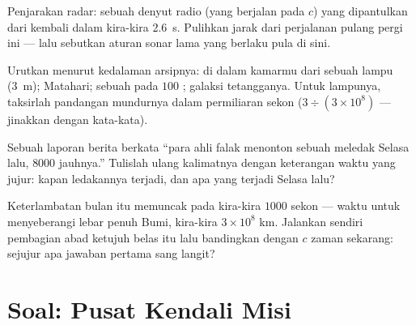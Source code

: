 \begin{exercise}[$\star\star$]\label{exo:g8:speed-of-light:9}
Penjarakan radar: sebuah denyut radio (yang berjalan pada $c$) yang
dipantulkan dari  kembali dalam kira-kira \qty{2.6}{s}. Pulihkan
jarak  dari perjalanan pulang pergi ini --- lalu sebutkan aturan
sonar lama yang berlaku pula di sini.
\end{exercise}

\begin{exercise}[$\star\star$]\label{exo:g8:speed-of-light:10}
Urutkan menurut kedalaman arsipnya:  di dalam kamarmu dari
sebuah lampu (\qty{3}{m}); Matahari; sebuah  pada $100$ ; galaksi tetangganya. Untuk lampunya, taksirlah pandangan
mundurnya dalam permiliaran sekon ($3 \div (3 \times 10^{8})$ ---
jinakkan dengan kata-kata).
\end{exercise}

\begin{exercise}[$\star\star$]\label{exo:g8:speed-of-light:11}
Sebuah laporan berita berkata ``para ahli falak menonton sebuah
 meledak Selasa lalu, $8000$  jauhnya.'' Tulislah
ulang kalimatnya dengan keterangan waktu yang jujur: kapan ledakannya
terjadi, dan apa yang terjadi Selasa lalu?
\end{exercise}

\begin{exercise}[$\star\star\star$]\label{exo:g8:speed-of-light:12}
Keterlambatan bulan itu memuncak pada kira-kira $1000$ sekon ---
waktu  untuk menyeberangi lebar penuh  Bumi, kira-kira
$3 \times 10^{8}$ km. Jalankan sendiri pembagian abad ketujuh belas
itu lalu bandingkan dengan $c$ zaman sekarang: sejujur apa jawaban
pertama sang langit?
\end{exercise}

\section{Soal: Pusat Kendali Misi}

